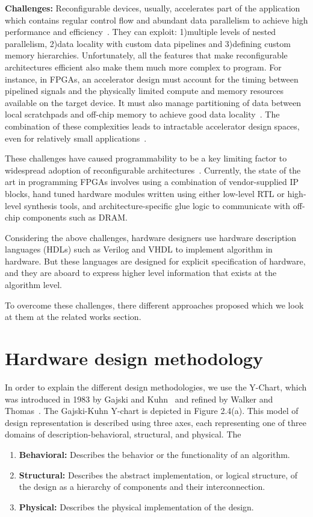 \textbf{Challenges:}
Reconfigurable devices, usually, accelerates part of the application which contains regular control flow and abundant data parallelism to achieve high performance and efficiency~\cite{spatial_computation, trips, govindaraju_hpca_2011}.
They can exploit: 1)multiple levels of nested parallelism, 2)data locality with custom data pipelines and 3)defining custom memory hierarchies.
Unfortunately, all the features that make reconfigurable architectures efficient also make them much more complex to program.
For instance, in FPGAs, an accelerator design must account for the timing between pipelined signals and the physically limited compute and memory resources available on the target device.
It must also manage partitioning of data between local scratchpads and off-chip memory to achieve good data locality~\cite{gzip_2013_fpga}.
The combination of these complexities leads to intractable accelerator design spaces, even for relatively small applications~\cite{cascaval_taxonomy_accelerator}.

These challenges have caused programmability to be a key limiting factor to widespread adoption of reconfigurable architectures~\cite{fpga_masses, cgra_architecture}.
Currently, the state of the art in programming FPGAs involves using a combination of vendor-supplied IP blocks, hand tuned hardware modules written using either low-level RTL or high-level synthesis tools, and architecture-specific glue logic to communicate with off-chip components such as DRAM.

Considering the above challenges, hardware designers use hardware description languages (HDLs) such as Verilog and VHDL to implement algorithm in hardware.
But these languages are designed for explicit specification of hardware, and they are aboard to express higher level information that exists at the algorithm level.

To overcome these challenges, there different approaches proposed which we look at them at the related works section.


\section{Hardware design methodology}

In order to explain the different design methodologies, we use the Y-Chart, which was introduced in 1983 by Gajski and Kuhn~\cite{gajski_1992_high} and refined by Walker and Thomas~\cite{walker_1985_y_model}.
The Gajski-Kuhn Y-chart is depicted in Figure 2.4(a). This model of design representation is described using three axes, each representing one of three domains of description-behavioral, structural, and physical. The

\begin{enumerate}
    \item \textbf{Behavioral: } Describes the behavior or the functionality of an algorithm.
    \item \textbf{Structural: } Describes the abstract implementation, or logical structure, of the design as a hierarchy of components and their interconnection.
    \item \textbf{Physical: }  Describes the physical implementation of the design.
\end{enumerate}
